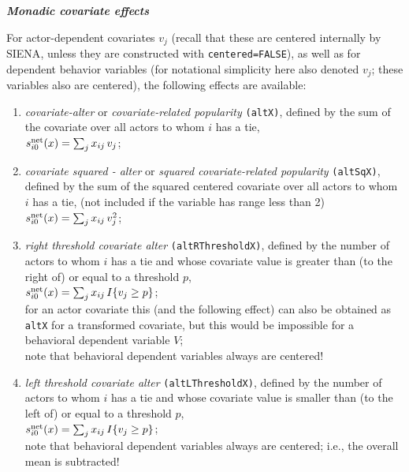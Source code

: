 \documentclass[a4paper,fleqn,11pt]{article}
\newcommand{\+}{\, + \,}
\newcommand{\si}{{\sf SIENA}}
\newcommand{\vit}{\theenumi}
\newcounter{savenumi}
\begin{document}
\noindent
\textbf{\emph{Monadic covariate effects}}
\medskip

\noindent
For actor-dependent covariates $v_j$ (recall that these are
centered internally by \si, unless they are constructed with
\texttt{centered=FALSE}), as well as for dependent behavior
variables (for notational simplicity here also denoted $v_j$;
these variables also are centered),
the following effects are available:
\begin{enumerate}
\setcounter{enumi}{\value{savenumi}}

 \item {\em covariate-alter} or {\em covariate-related popularity}
 \texttt{(altX)},
 defined by the sum of the covariate over all actors to whom $i$ has a tie,\\
 $s^{\rm net}_{i\vit}(x) = \sum_j x_{ij}\, v_j$;

 \item {\em covariate squared - alter} or {\em squared covariate-related popularity} \texttt{(altSqX)},
 defined by the sum of the squared centered covariate over all actors to whom $i$ has a tie,
 (not included if the variable has range less than 2)\\
 $s^{\rm net}_{i\vit}(x) = \sum_j x_{ij}\, v_j^2$;

 \item {\em right threshold covariate alter}
 \texttt{(altRThresholdX)},
 defined by the number of actors to whom $i$ has a tie
 and whose covariate value
 is greater than (to the right of)  or equal to a threshold $p$,\\
 $s^{\rm net}_{i\vit}(x) = \sum_j x_{ij}\, I\{v_j \geq p\} $;\\
 for an actor covariate this (and the following effect)
 can also be obtained as \texttt{altX} for a transformed
 covariate, but this would be impossible for a behavioral dependent variable $V$;\\
 note that behavioral dependent variables always are centered!

 \item {\em left threshold covariate alter}
 \texttt{(altLThresholdX)},
 defined by the number of actors to whom $i$ has a tie
 and whose covariate value
 is smaller than (to the left of)  or equal to a threshold $p$,\\
 $s^{\rm net}_{i\vit}(x) = \sum_j x_{ij}\, I\{v_j \geq p\} $;\\
 note that behavioral dependent variables always are centered;
 i.e., the overall mean is subtracted!


\end{enumerate}
\end{document}
